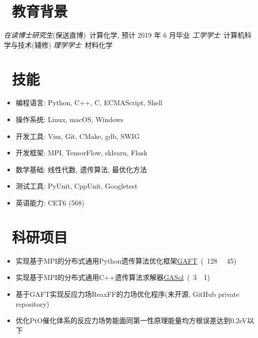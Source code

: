 \documentclass{resume}
\begin{document}


 
\section{\faGraduationCap\  教育背景}
\textit{在读博士研究生}(保送直博)\ 计算化学, 预计 2019 年 6 月毕业
\textit{工学学士}\ 计算机科学与技术(辅修)
\textit{理学学士}\ 材料化学

\section{\faCogs\ 技能}
\begin{itemize}[parsep=0.5ex]
  \item 编程语言: Python, C++, C, ECMAScript, Shell
  \item 操作系统: Linux, macOS, Windows
  \item 开发工具: Vim, Git, CMake, gdb, SWIG
  \item 开发框架: MPI, TensorFlow, sklearn, Flask
  \item 数学基础: 线性代数, 遗传算法, 最优化方法
  \item 测试工具: PyUnit, CppUnit, Googletest
  \item 英语能力: CET6 (568)
\end{itemize}

\section{\faUsers\ 科研项目}

\begin{onehalfspacing}
\begin{itemize}
    \item 实现基于MPI的分布式通用Python遗传算法优化框架\faLink \href{https://github.com/PytLab/gaft}{GAFT}\ (\faStar\ 128 \ \faCodeFork\ 45)
    \item 实现基于MPI的分布式通用C++遗传算法求解器\faLink \href{https://github.com/PytLab/GASol}{GASol}\ (\faStar\ 3\ \faCodeFork\ 1)
  \item 基于GAFT实现反应力场ReaxFF的力场优化程序(未开源, GitHub private repository)
  \item 优化PtO催化体系的反应力场势能面同第一性原理能量均方根误差达到0.2eV以下
\end{itemize}
\end{onehalfspacing}
\end{document}
